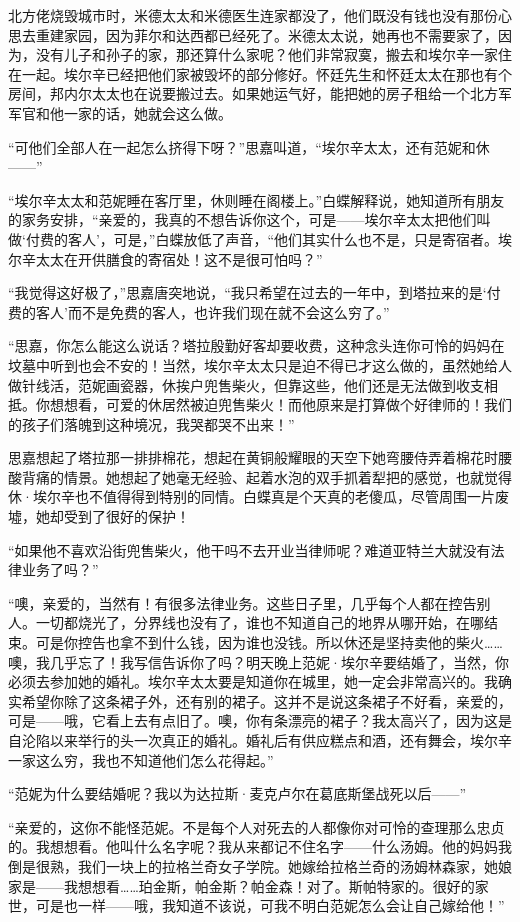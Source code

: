 \par 北方佬烧毁城市时，米德太太和米德医生连家都没了，他们既没有钱也没有那份心思去重建家园，因为菲尔和达西都已经死了。米德太太说，她再也不需要家了，因为，没有儿子和孙子的家，那还算什么家呢？他们非常寂寞，搬去和埃尔辛一家住在一起。埃尔辛已经把他们家被毁坏的部分修好。怀廷先生和怀廷太太在那也有个房间，邦内尔太太也在说要搬过去。如果她运气好，能把她的房子租给一个北方军军官和他一家的话，她就会这么做。
\par “可他们全部人在一起怎么挤得下呀？”思嘉叫道，“埃尔辛太太，还有范妮和休——”
\par “埃尔辛太太和范妮睡在客厅里，休则睡在阁楼上。”白蝶解释说，她知道所有朋友的家务安排，“亲爱的，我真的不想告诉你这个，可是——埃尔辛太太把他们叫做‘付费的客人’，可是，”白蝶放低了声音，“他们其实什么也不是，只是寄宿者。埃尔辛太太在开供膳食的寄宿处！这不是很可怕吗？”
\par “我觉得这好极了，”思嘉唐突地说，“我只希望在过去的一年中，到塔拉来的是‘付费的客人’而不是免费的客人，也许我们现在就不会这么穷了。”
\par “思嘉，你怎么能这么说话？塔拉殷勤好客却要收费，这种念头连你可怜的妈妈在坟墓中听到也会不安的！当然，埃尔辛太太只是迫不得已才这么做的，虽然她给人做针线活，范妮画瓷器，休挨户兜售柴火，但靠这些，他们还是无法做到收支相抵。你想想看，可爱的休居然被迫兜售柴火！而他原来是打算做个好律师的！我们的孩子们落魄到这种境况，我哭都哭不出来！”
\par 思嘉想起了塔拉那一排排棉花，想起在黄铜般耀眼的天空下她弯腰侍弄着棉花时腰酸背痛的情景。她想起了她毫无经验、起着水泡的双手抓着犁把的感觉，也就觉得休·埃尔辛也不值得得到特别的同情。白蝶真是个天真的老傻瓜，尽管周围一片废墟，她却受到了很好的保护！
\par “如果他不喜欢沿街兜售柴火，他干吗不去开业当律师呢？难道亚特兰大就没有法律业务了吗？”
\par “噢，亲爱的，当然有！有很多法律业务。这些日子里，几乎每个人都在控告别人。一切都烧光了，分界线也没有了，谁也不知道自己的地界从哪开始，在哪结束。可是你控告也拿不到什么钱，因为谁也没钱。所以休还是坚持卖他的柴火……噢，我几乎忘了！我写信告诉你了吗？明天晚上范妮·埃尔辛要结婚了，当然，你必须去参加她的婚礼。埃尔辛太太要是知道你在城里，她一定会非常高兴的。我确实希望你除了这条裙子外，还有别的裙子。这并不是说这条裙子不好看，亲爱的，可是——哦，它看上去有点旧了。噢，你有条漂亮的裙子？我太高兴了，因为这是自沦陷以来举行的头一次真正的婚礼。婚礼后有供应糕点和酒，还有舞会，埃尔辛一家这么穷，我也不知道他们怎么花得起。”
\par “范妮为什么要结婚呢？我以为达拉斯·麦克卢尔在葛底斯堡战死以后——”
\par “亲爱的，这你不能怪范妮。不是每个人对死去的人都像你对可怜的查理那么忠贞的。我想想看。他叫什么名字呢？我从来都记不住名字——什么汤姆。他的妈妈我倒是很熟，我们一块上的拉格兰奇女子学院。她嫁给拉格兰奇的汤姆林森家，她娘家是——我想想看……珀金斯，帕金斯？帕金森！对了。斯帕特家的。很好的家世，可是也一样——哦，我知道不该说，可我不明白范妮怎么会让自己嫁给他！”
